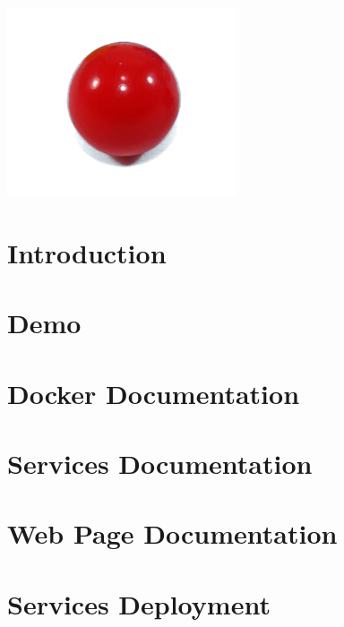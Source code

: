 \documentclass[11pt]{article}
\begin{document}
    \clearpage
    \maketitle
    \includegraphics[scale=1.5]{favicon}
    \thispagestyle{empty}

    \newpage
    \tableofcontents{}
    \thispagestyle{empty}

    \newpage
    \setcounter{page}{1}
    \section{Introduction}\label{sec:introduction}
    

    \newpage
    \section{Demo}\label{sec:Demo}
    

    \newpage
    \section{Docker Documentation}\label{sec:DockerDocumentation}
    

    \newpage
    \section{Services Documentation}\label{sec:ServicesDocumentation}
    

    \newpage
    \section{Web Page Documentation}\label{sec:Web Page Documentation}
    

    \newpage
    \section{Services Deployment}\label{sec:ServiceDeployment}
    
\end{document}
